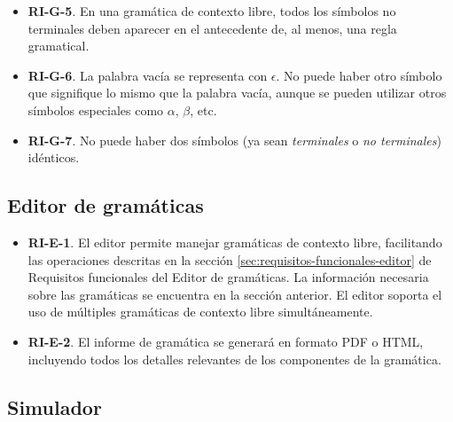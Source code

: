 \begin{itemize}
    \item \textbf{RI-G-5}. En una gramática de contexto libre, todos los símbolos no terminales deben aparecer en el antecedente de, al menos, una regla gramatical.

    \item \textbf{RI-G-6}. La palabra vacía se representa con $\epsilon$. No puede haber otro símbolo que signifique lo mismo que la palabra vacía, aunque se pueden utilizar otros símbolos especiales como $\alpha$, $\beta$, etc.

    \item \textbf{RI-G-7}. No puede haber dos símbolos (ya sean \textit{terminales} o \textit{no terminales}) idénticos.

\end{itemize}


\subsection{Editor de gramáticas}

\begin{itemize}
    \item \textbf{RI-E-1}. El editor permite manejar gramáticas de contexto libre, facilitando las operaciones descritas en la sección \ref{sec:requisitos-funcionales-editor} de Requisitos funcionales del Editor de gramáticas. La información necesaria sobre las gramáticas se encuentra en la sección anterior. El editor soporta el uso de múltiples gramáticas de contexto libre simultáneamente.

    \item \textbf{RI-E-2}. El informe de gramática se generará en formato PDF o HTML, incluyendo todos los detalles relevantes de los componentes de la gramática.
\end{itemize}


\subsection{Simulador}

